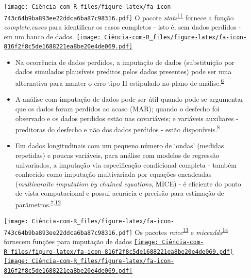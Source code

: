 \documentclass[
]{book}
\begin{document}
\texttt{[image: Ciência-com-R\_files/figure-latex/fa-icon-743c64b9ba893ee22ddca6ba87c98316.pdf]} O pacote \emph{stats}\textsuperscript{\protect\hyperlink{ref-stats}{11}} fornece a função \emph{complete.cases} para identificar os casos completos - isto é, sem dados perdidos - em um banco de dados. \href{https://stat.ethz.ch/R-manual/R-devel/library/stats/html/stats-package.html}{\texttt{[image: Ciência-com-R\_files/figure-latex/fa-icon-816f2f8c5de1688221ea8be20e4de069.pdf]}}

\begin{itemize}
\item
  Na ocorrência de dados perdidos, a imputação de dados (substituição por dados simulados plausíveis preditos pelos dados presentes) pode ser uma alternativa para manter o erro tipo II estipulado no plano de análise.\textsuperscript{\protect\hyperlink{ref-Altman2007}{6}}
\item
  A análise com imputação de dados pode ser útil quando pode-se argumentar que os dados foram perdidos ao acaso (MAR); quando o desfecho foi observado e os dados perdidos estão nas covariáveis; e variáveis auxiliares - preditoras do desfecho e não dos dados perdidos - estão disponíveis.\textsuperscript{\protect\hyperlink{ref-carpenter2021}{8}}
\item
  Em dados longitudinais com um pequeno número de `ondas' (medidas repetidas) e poucas variáveis, para análise com modelos de regressão univariados, a imputação via especificação condicional completa - também conhecido como imputação multivariada por equações encadeadas (\emph{multivaraite imputation by chained equations}, MICE) - é eficiente do ponto de vista computacional e possui acurácia e precisão para estimação de parâmetros.\textsuperscript{\protect\hyperlink{ref-Heymans2022}{7},\protect\hyperlink{ref-Cao2022}{12}}
\end{itemize}

\texttt{[image: Ciência-com-R\_files/figure-latex/fa-icon-743c64b9ba893ee22ddca6ba87c98316.pdf]} Os pacotes \emph{mice}\textsuperscript{\protect\hyperlink{ref-mice}{13}} e \emph{miceadds}\textsuperscript{\protect\hyperlink{ref-miceadds}{14}} fornecem funções para imputação de dados \href{https://cran.r-project.org/web/packages/mice/index.html}{\texttt{[image: Ciência-com-R\_files/figure-latex/fa-icon-816f2f8c5de1688221ea8be20e4de069.pdf]}} \href{https://cran.r-project.org/web/packages/miceadds/index.html}{\texttt{[image: Ciência-com-R\_files/figure-latex/fa-icon-816f2f8c5de1688221ea8be20e4de069.pdf]}}
\end{document}
